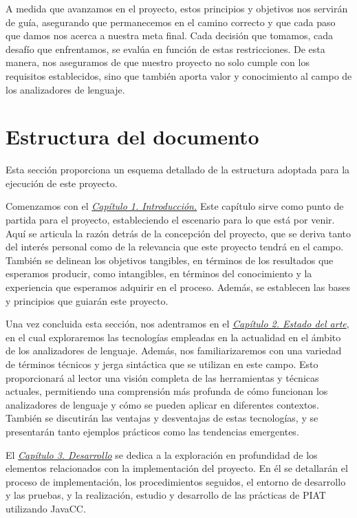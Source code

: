 A medida que avanzamos en el proyecto, estos principios y objetivos nos servirán de guía, asegurando que permanecemos en el camino correcto y que cada paso que damos nos acerca a nuestra meta final. Cada decisión que tomamos, cada desafío que enfrentamos, se evalúa en función de estas restricciones. De esta manera, nos aseguramos de que nuestro proyecto no solo cumple con los requisitos establecidos, sino que también aporta valor y conocimiento al campo de los analizadores de lenguaje.

\section{Estructura del documento}

Esta sección proporciona un esquema detallado de la estructura adoptada para la ejecución de este proyecto.

Comenzamos con el \hyperref[sec:cap1]{\textit{Capítulo 1. Introducción.}} Este capítulo sirve como punto de partida para el proyecto, estableciendo el escenario para lo que está por venir. Aquí se articula la razón detrás de la concepción del proyecto, que se deriva tanto del interés personal como de la relevancia que este proyecto tendrá en el campo. También se delinean los objetivos tangibles, en términos de los resultados que esperamos producir, como intangibles, en términos del conocimiento y la experiencia que esperamos adquirir en el proceso. Además, se establecen las bases y principios que guiarán este proyecto.

Una vez concluida esta sección, nos adentramos en el \hyperref[sec:cap2]{\textit{Capítulo 2. Estado del arte}}, en el cual exploraremos las tecnologías empleadas en la actualidad en el ámbito de los analizadores de lenguaje. Además, nos familiarizaremos con una variedad de términos técnicos y jerga sintáctica que se utilizan en este campo. Esto proporcionará al lector una visión completa de las herramientas y técnicas actuales, permitiendo una comprensión más profunda de cómo funcionan los analizadores de lenguaje y cómo se pueden aplicar en diferentes contextos. También se discutirán las ventajas y desventajas de estas tecnologías, y se presentarán tanto ejemplos prácticos como las tendencias emergentes.

El \hyperref[sec:cap3]{\textit{Capítulo 3. Desarrollo}} se dedica a la exploración en profundidad de los elementos relacionados con la implementación del proyecto. En él se detallarán el proceso de implementación, los procedimientos seguidos, el entorno de desarrollo y las pruebas, y la realización, estudio y desarrollo de las prácticas de PIAT utilizando JavaCC.

